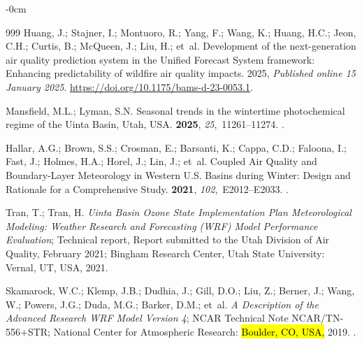 \documentclass[air,article,accept,moreauthors]{Definitions/mdpi}
\begin{document}
\begin{adjustwidth}{-\extralength}{0cm}
\begin{thebibliography}{999}
Huang, J.; Stajner, I.; Montuoro, R.; Yang, F.; Wang, K.; Huang, H.C.; Jeon, C.H.; Curtis, B.; McQueen, J.; Liu, H.;  et~al.
\newblock Development of the next-generation air quality prediction system in the Unified Forecast System framework: Enhancing predictability of wildfire air quality impacts.
 2025, 
\newblock \emph{Published online 15 January 2025}. {\url{https://doi.org/10.1175/bams-d-23-0053.1}}.

Mansfield, M.L.; Lyman, S.N.
\newblock Seasonal trends in the wintertime photochemical regime of the {Uinta Basin, Utah, USA}.
 {\bf 2025}, {\em 25},~11261--11274.
.

Hallar, A.G.; Brown, S.S.; Crosman, E.; Barsanti, K.; Cappa, C.D.; Faloona, I.; Fast, J.; Holmes, H.A.; Horel, J.; Lin, J.;  et~al.
\newblock Coupled Air Quality and Boundary-Layer Meteorology in Western {U}.{S}. Basins during Winter: Design and Rationale for a Comprehensive Study.
 {\bf 2021}, {\em 102},~E2012--E2033.
.

Tran, T.; Tran, H.
\newblock \emph{{Uinta Basin Ozone State Implementation Plan Meteorological Modeling}: {Weather Research and Forecasting (WRF) Model Performance Evaluation}}; 
\newblock Technical report, Report submitted to the Utah Division of Air Quality, February 2021; Bingham Research Center, Utah State University: Vernal, UT, USA,  2021.
\newblock 

Skamarock, W.C.; Klemp, J.B.; Dudhia, J.; Gill, D.O.; Liu, Z.; Berner, J.; Wang, W.; Powers, J.G.; Duda, M.G.; Barker, D.M.;  et~al.
\newblock \emph{A Description of the Advanced Research {WRF} Model Version 4};
\newblock NCAR Technical Note NCAR/TN-556+STR; National Center for Atmospheric Research: \hl{Boulder, CO, USA,} %
 2019.
.


\end{thebibliography}
\end{adjustwidth}
\end{document}
